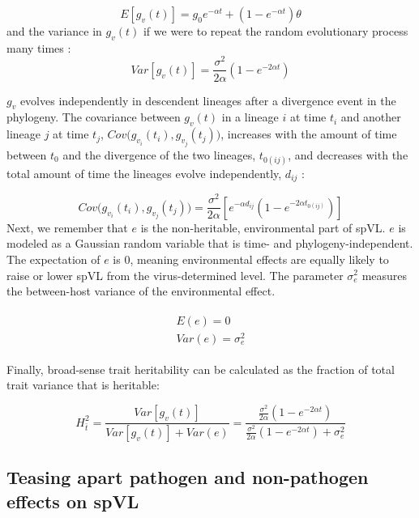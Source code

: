 \documentclass[11pt]{article}
\begin{document}
\begin{linenumbers}
\begin{equation}
   E[g_v(t)] = g_0e^{-\alpha t} + (1 - e^{-\alpha t})\theta \label{eq:OUmean}
\end{equation}
and the variance in $g_v(t)$ if we were to repeat the random evolutionary process many times \citep{Butler2004}:
\begin{equation}
    Var[g_v(t)] = \frac{\sigma^2}{2\alpha}(1 - e^{-2\alpha t}) \label{eq:OUVar}
\end{equation}

$g_v$ evolves independently in descendent lineages after a divergence event in the phylogeny. The covariance between $g_v(t)$ in a lineage $i$ at time $t_i$ and another lineage $j$ at time $t_j$, $Cov\big(g_{v_i}(t_i), g_{v_j}(t_j)\big)$, increases with the amount of time between $t_0$ and the divergence of the two lineages, $t_{0(ij)}$, and decreases with the total amount of time the lineages evolve independently, $d_{ij}$ \citep{Butler2004}: 

\begin{equation}
	Cov\big(g_{v_i}(t_i), g_{v_j}(t_j)\big) = \frac{\sigma^2}{2\alpha}[e^{-\alpha d_{ij}}(1 - e^{-2\alpha t_{0(ij)}})]
	\label{eq:OUcov}
\end{equation}
Next, we remember that $e$ is the non-heritable, environmental part of spVL. $e$ is modeled as a Gaussian random variable that is time- and phylogeny-independent. The expectation of $e$ is 0, meaning environmental effects are equally likely to raise or lower spVL from the virus-determined level. The parameter $\sigma_e^2$ measures the between-host variance of the environmental effect.

\begin{align}
\begin{split}
	E(e) = 0 \\
	Var(e) = \sigma^2_e
\end{split}
\end{align}

Finally, broad-sense trait heritability can be calculated as the fraction of total trait variance that is heritable:

\begin{equation}
	H^2_{\bar{t}} = \frac{Var[g_v(t)]}{Var[g_v(t)] + Var(e)} = \frac{\frac{\sigma^2}{2\alpha}(1 - e^{-2\alpha t})}{\frac{\sigma^2}{2\alpha}(1 - e^{-2\alpha t}) + \sigma^2_e}
\end{equation}

\subsection*{Teasing apart pathogen and non-pathogen effects on spVL}


\end{linenumbers}
\end{document}

